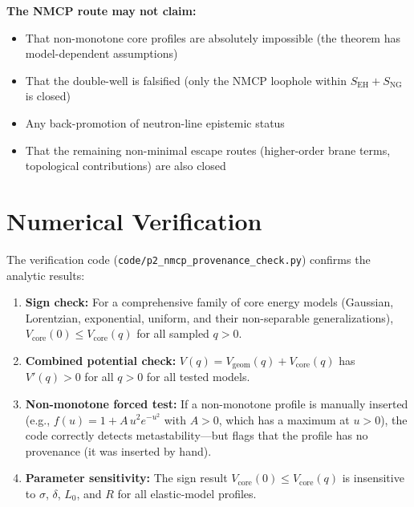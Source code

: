 \textbf{The NMCP route may not claim:}
\begin{itemize}
    \item That non-monotone core profiles are absolutely impossible
          (the theorem has model-dependent assumptions)
    \item That the double-well is falsified (only the NMCP loophole
          within $S_{\mathrm{EH}} + S_{\mathrm{NG}}$ is closed)
    \item Any back-promotion of neutron-line epistemic status
    \item That the remaining non-minimal escape routes (higher-order
          brane terms, topological contributions) are also closed
\end{itemize}

\section{Numerical Verification}
\label{sec:NMCP:numerical}

The verification code (\texttt{code/p2\_nmcp\_provenance\_check.py})
confirms the analytic results:

\begin{enumerate}
    \item \textbf{Sign check:} For a comprehensive family of core
          energy models (Gaussian, Lorentzian, exponential, uniform,
          and their non-separable generalizations), $V_{\mathrm{core}}(0)
          \leq V_{\mathrm{core}}(q)$ for all sampled $q > 0$.
    \item \textbf{Combined potential check:} $V(q) =
          V_{\mathrm{geom}}(q) + V_{\mathrm{core}}(q)$ has
          $V'(q) > 0$ for all $q > 0$ for all tested models.
    \item \textbf{Non-monotone forced test:} If a non-monotone
          profile is manually inserted (e.g., $f(u) = 1 + A\,u^2
          e^{-u^2}$ with $A > 0$, which has a maximum at $u > 0$),
          the code correctly detects metastability---but flags that
          the profile has no provenance (it was inserted by hand).
    \item \textbf{Parameter sensitivity:} The sign result
          $V_{\mathrm{core}}(0) \leq V_{\mathrm{core}}(q)$ is
          insensitive to $\sigma$, $\delta$, $L_0$, and $R$ for all
          elastic-model profiles.
\end{enumerate}

